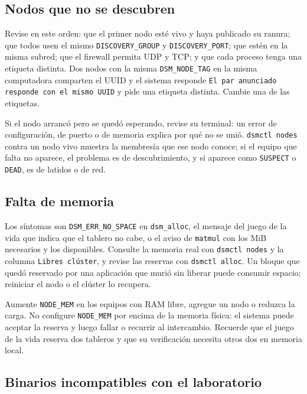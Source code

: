 \subsection{Nodos que no se descubren}\label{subsec:no-descubren}

Revise en este orden: que el primer nodo esté vivo y haya publicado su ranura; que todos usen el mismo \texttt{DISCOVERY\_GROUP} y \texttt{DISCOVERY\_PORT}; que estén en la misma subred; que el firewall permita UDP y TCP; y que cada proceso tenga una etiqueta distinta. Dos nodos con la misma \texttt{DSM\_NODE\_TAG} en la misma computadora comparten el UUID y el sistema responde \texttt{El par anunciado responde con el mismo UUID} y pide una etiqueta distinta. Cambie una de las etiquetas.

Si el nodo arrancó pero se quedó esperando, revise su terminal: un error de configuración, de puerto o de memoria explica por qué no se unió. \texttt{dsmctl nodes} contra un nodo vivo muestra la membresía que ese nodo conoce; si el equipo que falta no aparece, el problema es de descubrimiento, y si aparece como \texttt{SUSPECT} o \texttt{DEAD}, es de latidos o de red.

\subsection{Falta de memoria}\label{subsec:falta-memoria}

Los síntomas son \texttt{DSM\_ERR\_NO\_SPACE} en \texttt{dsm\_alloc}, el mensaje del juego de la vida que indica que el tablero no cabe, o el aviso de \texttt{matmul} con los MiB necesarios y los disponibles. Consulte la memoria real con \texttt{dsmctl nodes} y la columna \texttt{Libres clúster}, y revise las reservas con \texttt{dsmctl alloc}. Un bloque que quedó reservado por una aplicación que murió sin liberar puede consumir espacio; reiniciar el nodo o el clúster lo recupera.

Aumente \texttt{NODE\_MEM} en los equipos con RAM libre, agregue un nodo o reduzca la carga. No configure \texttt{NODE\_MEM} por encima de la memoria física: el sistema puede aceptar la reserva y luego fallar o recurrir al intercambio. Recuerde que el juego de la vida reserva dos tableros y que su verificación necesita otros dos en memoria local.

\subsection{Binarios incompatibles con el laboratorio}\label{subsec:binarios-incompatibles}

